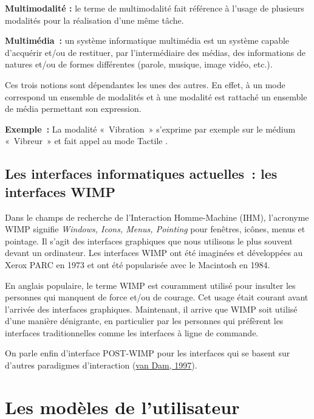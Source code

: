 \documentclass[
]{book}
\begin{document}
\textbf{Multimodalité :}
le terme de multimodalité fait référence à
l'usage de plusieurs modalités pour la réalisation d'une même tâche.

\textbf{Multimédia~:}
un système informatique multimédia est un
système capable d'acquérir et/ou de restituer, par l'intermédiaire des
médias, des informations de natures et/ou de formes différentes (parole,
musique, image vidéo, etc.).

Ces trois notions sont dépendantes les unes des autres. En effet, à un
mode correspond un ensemble de modalités et à une modalité est rattaché un
ensemble de média permettant son expression.

\textbf{Exemple~:} La modalité «~Vibration~» s'exprime par exemple sur le
médium «~Vibreur~» et fait appel au mode Tactile .

\hypertarget{les-interfaces-informatiques-actuelles-les-interfaces-wimp}{%
\subsection{Les interfaces informatiques actuelles~: les interfaces WIMP}\label{les-interfaces-informatiques-actuelles-les-interfaces-wimp}}

Dans le champs de recherche de l'Interaction Homme-Machine (IHM),
l'acronyme WIMP signifie \emph{Windows, Icons, Menus, Pointing} pour
fenêtres, icônes, menus et pointage. Il s'agit des interfaces graphiques que
nous utilisons le plus souvent devant un ordinateur. Les interfaces WIMP ont
été imaginées et développées au Xerox PARC en 1973 et ont été popularisée
avec le Macintosh en 1984.

En anglais populaire, le terme WIMP est couramment utilisé pour insulter
les personnes qui manquent de force et/ou de courage. Cet usage était courant
avant l'arrivée des interfaces graphiques. Maintenant, il arrive que WIMP
soit utilisé d'une manière dénigrante, en particulier par les personnes qui
préfèrent les interfaces traditionnelles comme les interfaces à ligne de
commande.

On parle enfin d'interface POST-WIMP pour les interfaces qui se basent sur
d'autres paradigmes d'interaction (\href{047-bibliographie.html\#Dam1997}{van Dam,
1997}).

\hypertarget{les-moduxe8les-de-lutilisateur}{%
\section{Les modèles de l'utilisateur}\label{les-moduxe8les-de-lutilisateur}}
\end{document}
